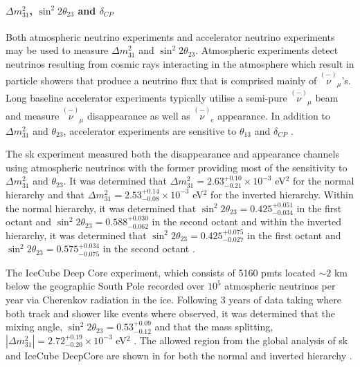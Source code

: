 \paragraph{$\Delta m^2_{31}$, $\sin^2{2\theta_{23}}$ and $\delta_{CP}$}
Both atmospheric neutrino experiments and accelerator neutrino experiments may be used to measure $\Delta m^2_{31}$ and $\sin^2{2\theta_{23}}$. Atmospheric experiments detect neutrinos resulting from cosmic rays interacting in the atmosphere which result in particle showers that produce a neutrino flux that is comprised mainly of $\overset{(-)}{\nu}_{\!\!\mu}$'s. Long baseline accelerator experiments typically utilise a semi-pure $\overset{(-)}{\nu}_{\!\!\mu}$ beam and measure $\overset{(-)}{\nu}_{\!\!\mu}$ disappearance as well as $\overset{(-)}{\nu}_{\!\!e}$ appearance. In addition to $\Delta m^2_{31}$ and $\theta_{23}$, accelerator experiments are sensitive to $\theta_{13}$ and $\delta_{CP}$ \cite{2020_global_reassessment_of_the_neutrino_oscillation_picture}. 


The \gls{sk} experiment measured both the \numu disappearance and \nue appearance channels using atmospheric neutrinos with the former providing most of the sensitivity to $\Delta m^2_{31}$ and $\theta_{23}$. It was determined that $\Delta m^2_{31} = 2.63^{+0.10}_{-0.21} \times 10^{-3}$ eV$^2$ for the normal hierarchy and that $\Delta m^2_{31} = 2.53^{+0.14}_{-0.08} \times 10^{-3}$ eV$^2$ for the inverted hierarchy. Within the normal hierarchy, it was determined that $\sin^2{2\theta_{23}} = 0.425^{+0.051}_{-0.034}$ in the first octant and $\sin^2{2\theta_{23}} = 0.588^{+0.030}_{-0.062}$ in the second octant and within the inverted hierarchy, it was determined that $\sin^2{2\theta_{23}} = 0.425^{+0.075}_{-0.027}$ in the first octant and $\sin^2{2\theta_{23}} = 0.575^{+0.034}_{-0.075}$ in the second octant \cite{Atmospheric_Neutrino_Oscillation_Analysis_With_Improved_Event_Reconstruction_in_Super_Kamiokande_IV}.

The IceCube Deep Core experiment, which consists of 5160 \glspl{pmt} located $\sim2$ km below the geographic South Pole recorded over $10^5$ atmospheric neutrinos per year via Cherenkov radiation in the ice. Following 3 years of data taking where both track and shower like events where observed, it was determined that the mixing angle, $\sin^2{2\theta_{23}} = 0.53^{+0.09}_{-0.12}$ and that the mass splitting, $|\Delta m^2_{31}| = 2.72^{+0.19}_{-0.20} \times 10^{-3}$ eV$^2$ \cite{Determining_neutrino_oscillation_parameters_from_atmospheric_muon_neutrino_disappearance_with_three_years_of_IceCube_DeepCore_data}. The allowed region from the global analysis of \gls{sk} and IceCube DeepCore are shown in  for both the normal and inverted hierarchy \cite{2020_global_reassessment_of_the_neutrino_oscillation_picture}.

